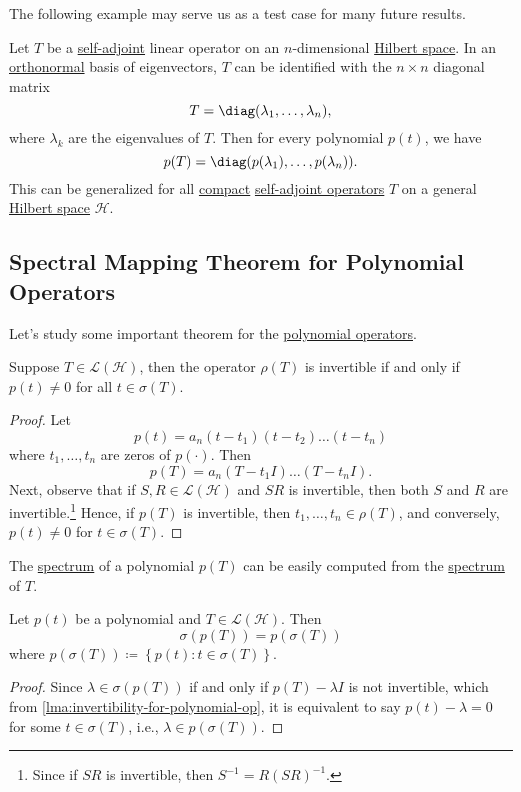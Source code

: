 The following example may serve us as a test case for many future results.

\begin{eg}
	Let \(T\) be a \hyperref[def:self-adjoint-op]{self-adjoint} linear operator on an \(n\)-dimensional \hyperref[def:Hilbert-space]{Hilbert space}. In an \hyperref[def:orthonormal-system]{orthonormal} basis of eigenvectors, \(T\) can be identified with the \(n \times n\) diagonal matrix
	\[
		T = \diag (\lambda _1, \ldots , \lambda _n),
	\]
	where \(\lambda _k\) are the eigenvalues of \(T\). Then for every polynomial \(p(t)\), we have
	\[
		p(T) = \diag (p(\lambda _1), \ldots  , p(\lambda _n)).
	\]
	This can be generalized for all \hyperref[def:compact-op]{compact} \hyperref[def:self-adjoint-op]{self-adjoint operators} \(T\) on a general \hyperref[def:Hilbert-space]{Hilbert space} \(\mathcal{H} \).
\end{eg}

\subsection{Spectral Mapping Theorem for Polynomial Operators}
Let's study some important theorem for the \hyperref[def:polynomial-op]{polynomial operators}.

\begin{lemma}\label{lma:invertibility-for-polynomial-op}
	Suppose \(T\in \mathcal{L} (\mathcal{H} )\), then the operator \(\rho (T)\) is invertible if and only if \(p(t) \neq 0\) for all \(t\in \sigma (T)\).
\end{lemma}
\begin{proof}
	Let
	\[
		p(t) = a_n (t-t_1)(t-t_2)\ldots  (t-t_n)
	\]
	where \(t_1, \ldots  , t_n\) are zeros of \(p(\cdot)\). Then
	\[
		p(T) = a_n (T-t_1 I)\ldots  (T-t_n I).
	\]
	Next, observe that if \(S, R\in \mathcal{L} (\mathcal{H} )\) and \(SR\) is invertible, then both \(S\) and \(R\) are invertible.\footnote{Since if \(SR\) is invertible, then \(S^{-1} = R(SR)^{-1} \).} Hence, if \(p(T)\) is invertible, then \(t_1, \ldots  , t_n\in \rho (T)\), and conversely, \(p(t) \neq 0\) for \(t\in \sigma (T)\).
\end{proof}

The \hyperref[def:spectrum-point]{spectrum} of a polynomial \(p(T)\) can be easily computed from the \hyperref[def:spectrum-point]{spectrum} of \(T\).

\begin{theorem}\label{thm:spectral-mapping-for-polynomial-op}
	Let \(p(t)\) be a polynomial and \(T\in \mathcal{L} (\mathcal{H} )\). Then
	\[
		\sigma (p(T)) = p(\sigma (T))
	\]
	where \(p(\sigma (T)) \coloneqq \left\{ p(t) \colon t\in \sigma (T) \right\} \).
\end{theorem}
\begin{proof}
	Since \(\lambda \in \sigma (p(T))\) if and only if \(p(T) - \lambda I\) is not invertible, which from \autoref{lma:invertibility-for-polynomial-op}, it is equivalent to say \(p(t) - \lambda = 0\) for some \(t\in \sigma (T)\), i.e., \(\lambda \in p(\sigma (T))\).
\end{proof}


